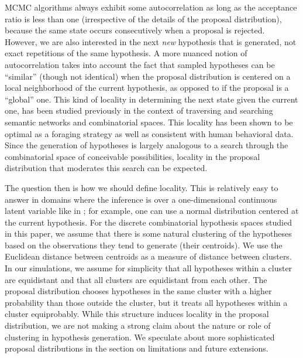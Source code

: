 MCMC algorithms always exhibit some autocorrelation 
as long as the acceptance ratio is less than one (irrespective of the details of the proposal distribution), because the same state occurs consecutively when a proposal is rejected.
However, we are also interested in the next \textit{new} hypothesis that is generated, not exact repetitions of the same hypothesis. A more nuanced notion of autocorrelation takes into account the fact that sampled hypotheses can be ``similar'' (though not identical) when the proposal distribution is centered on a local neighborhood of the current hypothesis, as opposed to if the proposal is a ``global'' one. This kind of locality in determining the next state given the current one, has been studied previously in the context of traversing and searching semantic networks \citep{abbott2015random} and combinatorial spaces.\citep{smith2013multiply} This locality has been shown to be optimal as a foraging strategy \citep{hills2012optimal} as well as consistent with human behavioral data. Since the generation of hypotheses is largely analogous to a search through the combinatorial space of conceivable possibilities, locality in the proposal distribution that moderates this search can be expected.

The question then is how we should define locality. This is relatively easy to answer in domains where the inference is over a one-dimensional continuous latent variable like in \cite{Lieder2013}; for example, one can use a normal distribution centered at the current hypothesis. For the discrete combinatorial hypothesis spaces studied in this paper, we assume that there is some natural clustering of the hypotheses based on the observations they tend to generate (their centroids). We use the Euclidean distance between centroids as a measure of distance between clusters. In our simulations, we assume for simplicity that all hypotheses within a cluster are equidistant and that all clusters are equidistant from each other. The proposal distribution chooses hypotheses in the same cluster with a higher probability than those outside the cluster, but it treats all hypotheses within a cluster equiprobably. While this structure induces locality in the proposal distribution, we are not making a strong claim about the nature or role of clustering in hypothesis generation. We speculate about more sophisticated proposal distributions in the section on limitations and future extensions. 


